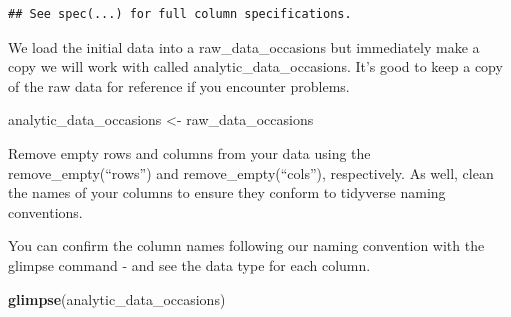 \documentclass[
]{krantz}
\makeatletter
\newenvironment{Shaded}{\begin{snugshade}}{\end{snugshade}}
\newcommand{\CommentTok}[1]{\textcolor[rgb]{0.37,0.37,0.37}{\textit{#1}}}
\newcommand{\KeywordTok}[1]{\textcolor[rgb]{0.27,0.27,0.27}{\textbf{#1}}}
\newcommand{\NormalTok}[1]{#1}
\newcommand{\OperatorTok}[1]{\textcolor[rgb]{0.43,0.43,0.43}{\textbf{#1}}}
\newcommand{\StringTok}[1]{\textcolor[rgb]{0.5,0.5,0.5}{#1}}
\newenvironment{kframe}{%
\medskip{}
\setlength{\fboxsep}{.8em}
 \def\at@end@of@kframe{}%
 \ifinner\ifhmode%
  \def\at@end@of@kframe{\end{minipage}}%
  \begin{minipage}{\columnwidth}%
 \fi\fi%
 \def\FrameCommand##1{\hskip\@totalleftmargin \hskip-\fboxsep
 \colorbox{shadecolor}{##1}\hskip-\fboxsep
     \hskip-\linewidth \hskip-\@totalleftmargin \hskip\columnwidth}%
 \MakeFramed {\advance\hsize-\width
   \@totalleftmargin\z@ \linewidth\hsize
   \@setminipage}}%
 {\par\unskip\endMakeFramed%
 \at@end@of@kframe}
\renewenvironment{Shaded}{\begin{kframe}}{\end{kframe}}
\makeatother
\begin{document}
\begin{verbatim}
## See spec(...) for full column specifications.
\end{verbatim}

We load the initial data into a raw\_data\_occasions but immediately make a copy we will work with called analytic\_data\_occasions. It's good to keep a copy of the raw data for reference if you encounter problems.

\begin{Shaded}
\begin{Highlighting}[]
\NormalTok{analytic_data_occasions <-}\StringTok{ }\NormalTok{raw_data_occasions}
\end{Highlighting}
\end{Shaded}

Remove empty rows and columns from your data using the remove\_empty(``rows'') and remove\_empty(``cols''), respectively. As well, clean the names of your columns to ensure they conform to tidyverse naming conventions.

\begin{Shaded}
\end{Shaded}

You can confirm the column names following our naming convention with the glimpse command - and see the data type for each column.

\begin{Shaded}
\begin{Highlighting}[]
\KeywordTok{glimpse}\NormalTok{(analytic_data_occasions)}
\end{Highlighting}
\end{Shaded}
\end{document}
